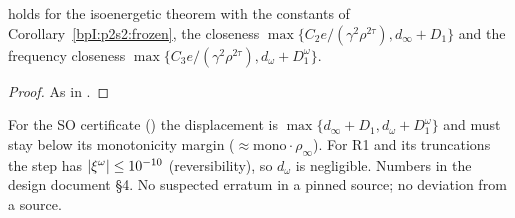 \begin{corollary}\label{bpI:p2s2hc:frozen}
 holds for the isoenergetic theorem with the constants of Corollary~\ref{bpI:p2s2:frozen}, the closeness
$\max\{C_2e/(\gamma^2\rho^{2\tau}),d_\infty+D_1\}$ and the frequency closeness $\max\{C_3e/(\gamma^2\rho^{2\tau}),d_\omega+D_1^\omega\}$.
\end{corollary}

\begin{proof}
\label{stepI:p2s2hc:fr}
As in .
\end{proof}

\begin{remark}[Register]\label{bpI:p2s2hc:register}
For the SO certificate () the displacement is $\max\{d_\infty+D_1,d_\omega+D_1^\omega\}$ and must stay below its monotonicity margin
($\approx\mathrm{mono}\cdot\rho_\infty$). For R1 and its truncations the step has $\lvert \xi^\omega\rvert\le10^{-10}$ (reversibility), so $d_\omega$ is negligible. Numbers in the
design document \S4. No suspected erratum in a pinned source; no deviation from a source.
\end{remark}
